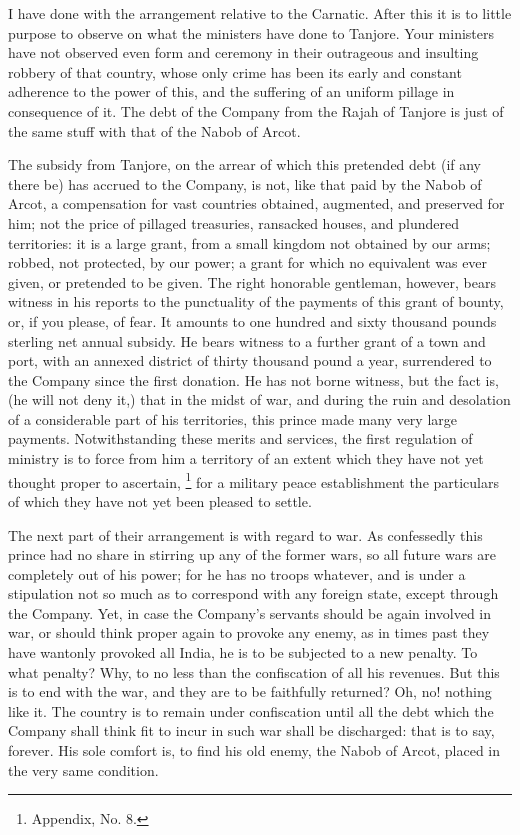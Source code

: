I have done with the arrangement relative to the Carnatic. After this it is to little purpose to observe on what the ministers have done to Tanjore. Your ministers have not observed even form and ceremony in their outrageous and insulting robbery of that country, whose only crime has been its early and constant adherence to the power of this, and the suffering of an uniform pillage in consequence of it. The debt of the Company from the Rajah of Tanjore is just of the same stuff with that of the Nabob of Arcot.

The subsidy from Tanjore, on the arrear of which this pretended debt (if any there be) has accrued to the Company, is not, like that paid by the Nabob of Arcot, a compensation for vast countries obtained, augmented, and preserved for him; not the price of pillaged treasuries, ransacked houses, and plundered territories: it is a large grant, from a small kingdom not obtained by our arms; robbed, not protected, by our power; a grant for which no equivalent was ever given, or pretended to be given. The right honorable gentleman, however, bears witness in his reports to the punctuality of the payments of this grant of bounty, or, if you please, of fear. It amounts to one hundred and sixty thousand pounds sterling net annual subsidy. He bears witness to a further grant of a town and port, with an annexed district of thirty thousand pound a year, surrendered to the Company since the first donation. He has not borne witness, but the fact is, (he will not deny it,) that in the midst of war, and during the ruin and desolation of a considerable part of his territories, this prince made many very large payments. Notwithstanding these merits and services, the first regulation of ministry is to force from him a territory of an extent which they have not yet thought proper to ascertain,
\footnote{ Appendix, No. 8.}
 for a military peace establishment the particulars of which they have not yet been pleased to settle.

The next part of their arrangement is with regard to war. As confessedly this prince had no share in stirring up any of the former wars, so all future wars are completely out of his power; for he has no troops whatever, and is under a stipulation not so much as to correspond with any foreign state, except through the Company. Yet, in case the Company's servants should be again involved in war, or should think proper again to provoke any enemy, as in times past they have wantonly provoked all India, he is to be subjected to a new penalty. To what penalty? Why, to no less than the confiscation of all his revenues. But this is to end with the war, and they are to be faithfully returned? Oh, no! nothing like it. The country is to remain under confiscation until all the debt which the Company shall think fit to incur in such war shall be discharged: that is to say, forever. His sole comfort is, to find his old enemy, the Nabob of Arcot, placed in the very same condition.

